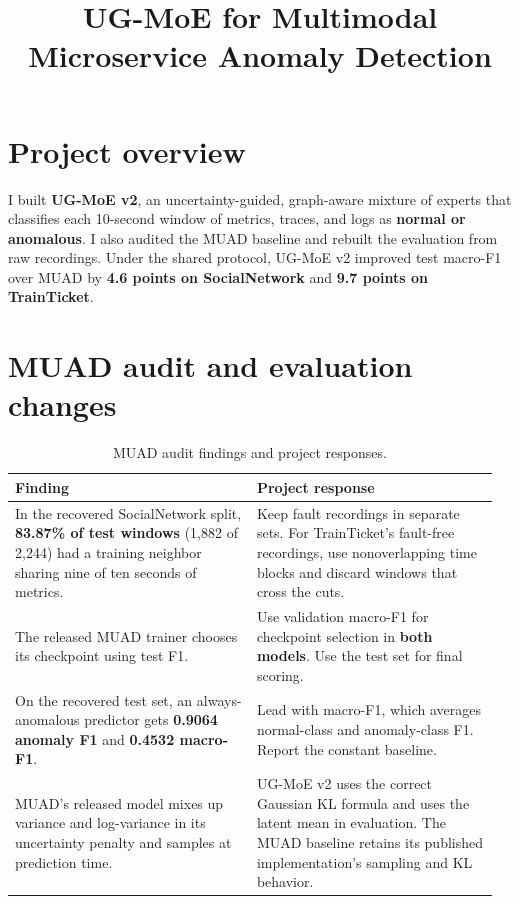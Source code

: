 \documentclass[11pt,a4paper,onecolumn]{IEEEtran}
\title{\bfseries UG-MoE for Multimodal\\Microservice Anomaly Detection}
\author{}
\date{}
\begin{document}
\maketitle
\thispagestyle{plain}

\section{Project overview}

I built \textbf{UG-MoE v2}, an uncertainty-guided, graph-aware mixture of experts that classifies each
10-second window of metrics, traces, and logs as \textbf{normal or anomalous}. I also audited the MUAD
baseline and rebuilt the evaluation from raw recordings. Under the shared protocol, UG-MoE v2 improved test
macro-F1 over MUAD by \textbf{4.6 points on SocialNetwork} and \textbf{9.7 points on TrainTicket}.

\section{MUAD audit and evaluation changes}

\begin{table}[H]
\centering
\small
\setlength{\tabcolsep}{4pt}
\renewcommand{\arraystretch}{1.18}
\caption{MUAD audit findings and project responses.}
\begin{tabular}{@{}P{0.48\linewidth}P{0.48\linewidth}@{}}
\toprule
\textbf{Finding} & \textbf{Project response} \\
\midrule
In the recovered SocialNetwork split, \textbf{83.87\% of test windows} (1,882 of 2,244) had a training neighbor sharing nine of ten seconds of metrics. &
  Keep fault recordings in separate sets. For TrainTicket's fault-free recordings, use nonoverlapping time blocks and discard windows that cross the cuts. \\
The released MUAD trainer chooses its checkpoint using test F1. &
  Use validation macro-F1 for checkpoint selection in \textbf{both models}. Use the test set for final scoring. \\
On the recovered test set, an always-anomalous predictor gets \textbf{0.9064 anomaly F1} and \textbf{0.4532 macro-F1}. &
  Lead with macro-F1, which averages normal-class and anomaly-class F1. Report the constant baseline. \\
MUAD's released model mixes up variance and log-variance in its uncertainty penalty and samples at prediction time. &
  UG-MoE v2 uses the correct Gaussian KL formula and uses the latent mean in evaluation. The MUAD baseline retains its published implementation's sampling and KL behavior. \\
\bottomrule
\end{tabular}
\end{table}
\end{document}
